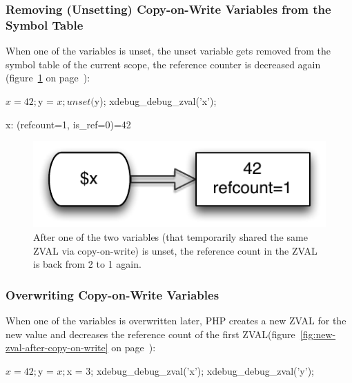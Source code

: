 \subsubsection{Removing (Unsetting) Copy-on-Write Variables from the Symbol Table}
\label{sec:unsetting}

When one of the variables is unset, the unset variable gets removed from the symbol table of the current scope, the reference counter is decreased again (figure~\ref{fig:reference-count-decreased} on page~\pageref{fig:reference-count-decreased}):

\begin{phpcode}
$x = 42;
$y = $x;
unset($y);
xdebug_debug_zval('x');
\end{phpcode}

\begin{textcode}
x: (refcount=1, is_ref=0)=42
\end{textcode}

\begin{figure}[htb]
  \begin{center}
    \includegraphics[scale=0.8]{images/x_42}
    \caption{After one of the two variables (that temporarily shared the same ZVAL via copy-on-write) is unset, the reference count in the ZVAL is back from 2 to 1 again.}
    \label{fig:reference-count-decreased}
  \end{center}
\end{figure}


\subsubsection{Overwriting Copy-on-Write Variables}
\label{sec:overwriting}

When one of the variables is overwritten later, PHP creates a new ZVAL for the new value and decreases the reference count of the first ZVAL(figure~\ref{fig:new-zval-after-copy-on-write} on page~\pageref{fig:new-zval-after-copy-on-write}):

\begin{phpcode}
$x = 42;
$y = $x;
$x = 3;
xdebug_debug_zval('x');
xdebug_debug_zval('y');
\end{phpcode}

